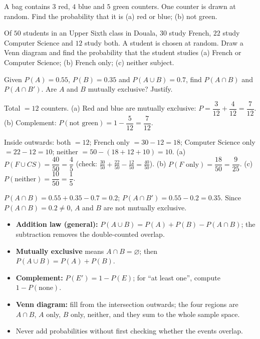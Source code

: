 \documentclass[11pt]{article}
\begin{document}
\begin{exercice}[]
A bag contains $3$ red, $4$ blue and $5$ green counters. One counter is drawn at random. Find the probability that it is (a) red or blue; (b) not green.
\end{exercice}

\begin{exercice}[]
Of $50$ students in an Upper Sixth class in Douala, $30$ study French, $22$ study Computer Science and $12$ study both. A student is chosen at random. Draw a Venn diagram and find the probability that the student studies (a) French or Computer Science; (b) French only; (c) neither subject.
\end{exercice}

\begin{exercice}[]
Given $P(A)=0.55$, $P(B)=0.35$ and $P(A\cup B)=0.7$, find $P(A\cap B)$ and $P(A\cap B')$. Are $A$ and $B$ mutually exclusive? Justify.
\end{exercice}

\begin{corrige}[Exercise 1]
Total $=12$ counters. (a) Red and blue are mutually exclusive: $P=\dfrac{3}{12}+\dfrac{4}{12}=\dfrac{7}{12}$. (b) Complement: $P(\text{not green})=1-\dfrac{5}{12}=\dfrac{7}{12}$.
\end{corrige}

\begin{corrige}[Exercise 2]
Inside outwards: both $=12$; French only $=30-12=18$; Computer Science only $=22-12=10$; neither $=50-(18+12+10)=10$.
(a) $P(F\cup CS)=\dfrac{40}{50}=\dfrac45$ (check: $\tfrac{30}{50}+\tfrac{22}{50}-\tfrac{12}{50}=\tfrac{40}{50}$). (b) $P(F\text{ only})=\dfrac{18}{50}=\dfrac{9}{25}$. (c) $P(\text{neither})=\dfrac{10}{50}=\dfrac15$.
\end{corrige}

\begin{corrige}[Exercise 3]
$P(A\cap B)=0.55+0.35-0.7=0.2$; $P(A\cap B')=0.55-0.2=0.35$. Since $P(A\cap B)=0.2\neq0$, $A$ and $B$ are not mutually exclusive.
\end{corrige}

\begin{aretenir}
\begin{itemize}
\item \textbf{Addition law (general):} $P(A\cup B)=P(A)+P(B)-P(A\cap B)$; the subtraction removes the double-counted overlap.
\item \textbf{Mutually exclusive} means $A\cap B=\varnothing$; then $P(A\cup B)=P(A)+P(B)$.
\item \textbf{Complement:} $P(E')=1-P(E)$; for ``at least one'', compute $1-P(\text{none})$.
\item \textbf{Venn diagram:} fill from the intersection outwards; the four regions are $A\cap B$, $A$ only, $B$ only, neither, and they sum to the whole sample space.
\item Never add probabilities without first checking whether the events overlap.
\end{itemize}
\end{aretenir}
\end{document}
